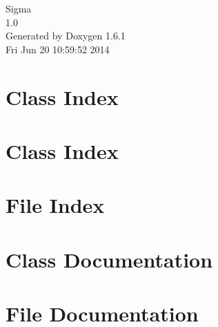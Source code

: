 \documentclass[a4paper]{book}
\begin{document}
\hypersetup{pageanchor=false}
\begin{titlepage}
\vspace*{7cm}
\begin{center}
{\Large Sigma \\[1ex]\large 1.0 }\\
\vspace*{1cm}
{\large Generated by Doxygen 1.6.1}\\
\vspace*{0.5cm}
{\small Fri Jun 20 10:59:52 2014}\\
\end{center}
\end{titlepage}
\clearemptydoublepage
{}
\tableofcontents
\clearemptydoublepage
{}
\hypersetup{pageanchor=true}
\chapter{Class Index}

\chapter{Class Index}

\chapter{File Index}

\chapter{Class Documentation}


















\chapter{File Documentation}


















\printindex
\end{document}

